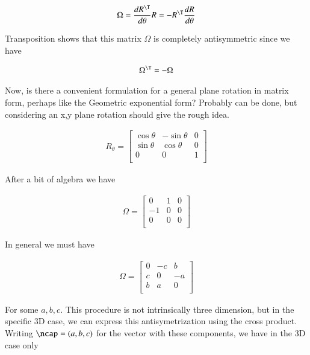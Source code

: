 \begin{align}\label{eqn:rotationGen:boo3}
\Omega = \frac{dR^\T}{d\theta} R = -R^\T \frac{dR}{d\theta}
\end{align}

Transposition shows that this matrix $\Omega$ is completely antisymmetric since we have

\begin{align}\label{eqn:rotationGen:boo4}
\Omega^\T = -\Omega
\end{align}

Now, is there a convenient formulation for a general plane rotation in matrix form, perhaps like the Geometric exponential form?  Probably can be done, but considering an x,y plane rotation should give the rough idea.

\begin{align}\label{eqn:rotationGen:boo5}
R_\theta = 
\begin{bmatrix}
\cos\theta & -\sin\theta & 0 \\
\sin\theta &  \cos\theta & 0 \\
0 & 0 & 1 \\
\end{bmatrix}
\end{align}

After a bit of algebra we have

\begin{align}\label{eqn:rotationGen:boo6}
\Omega = 
\begin{bmatrix}
0 & 1 & 0 \\
-1 & 0 & 0 \\
0 & 0 & 0 \\
\end{bmatrix}
\end{align}

In general we must have 

\begin{align}\label{eqn:rotationGen:boo7}
\Omega = 
\begin{bmatrix}
0 & -c & b \\
c & 0 & -a \\
b & a & 0 \\
\end{bmatrix}
\end{align}

For some $a,b,c$.  This procedure is not intrinsically three dimension, but in the specific 3D case, we can express this antisymetrization using the cross product.  Writing $\ncap = (a,b,c)$ for the vector with these components, we have in the 3D case only

